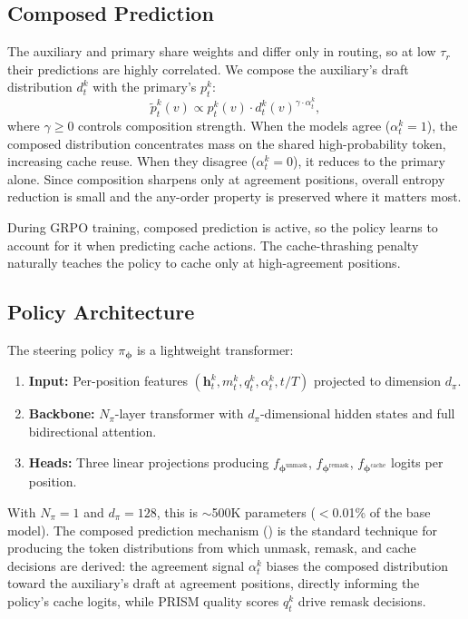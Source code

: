 \documentclass[11pt]{article}
\newcommand{\bphi}{\bm{\phi}}
\newcommand{\bh}{\mathbf{h}}
\begin{document}
\subsection{Composed Prediction}
\label{sec:composed}

The auxiliary and primary share weights and differ only in routing, so at low $\tau_r$ their predictions are highly correlated.
We compose the auxiliary's draft distribution $d_t^k$ with the primary's $p_t^k$:
\begin{equation}
    \tilde{p}_t^k(v) \propto p_t^k(v) \cdot d_t^k(v)^{\gamma \cdot \alpha_t^k},
    \label{eq:composed}
\end{equation}
where $\gamma \geq 0$ controls composition strength.
When the models agree ($\alpha_t^k = 1$), the composed distribution concentrates mass on the shared high-probability token, increasing cache reuse.
When they disagree ($\alpha_t^k = 0$), it reduces to the primary alone.
Since composition sharpens only at agreement positions, overall entropy reduction is small and the any-order property is preserved where it matters most.

During GRPO training, composed prediction is active, so the policy learns to account for it when predicting cache actions.
The cache-thrashing penalty naturally teaches the policy to cache only at high-agreement positions.

\subsection{Policy Architecture}
\label{sec:architecture}

The steering policy $\pi_{\bphi}$ is a lightweight transformer:
\begin{enumerate}[leftmargin=*,itemsep=2pt]
    \item \textbf{Input:} Per-position features $(\bh_t^k, m_t^k, q_t^k, \alpha_t^k, t/T)$ projected to dimension $d_\pi$.
    \item \textbf{Backbone:} $N_\pi$-layer transformer with $d_\pi$-dimensional hidden states and full bidirectional attention.
    \item \textbf{Heads:} Three linear projections producing $f_{\bphi^{\text{unmask}}}$, $f_{\bphi^{\text{remask}}}$, $f_{\bphi^{\text{cache}}}$ logits per position.
\end{enumerate}
With $N_\pi = 1$ and $d_\pi = 128$, this is ${\sim}$500K parameters ($<$0.01\% of the base model).
The composed prediction mechanism () is the standard technique for producing the token distributions from which unmask, remask, and cache decisions are derived: the agreement signal $\alpha_t^k$ biases the composed distribution toward the auxiliary's draft at agreement positions, directly informing the policy's cache logits, while PRISM quality scores $q_t^k$ drive remask decisions.
\end{document}
